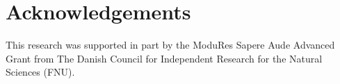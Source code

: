 \documentclass[compsoc,conference,letterpaper,fleqn]{IEEEtran}
\begin{document}
\begin{comment}
** LB: maybe we can present the examples informally before the logical relation and then return to them after the logical relation (to present the formal properties) ?

** Logical relation
   
   - Intuition
   - Worlds
   - Logical relation
   - Fundamental theorem
   - Discussion/comparison with related Dreyer-Neis-Birkedal and with Hur-Dreyer

** Examples
   - Ticket dispenser
   - The awkward example and variants
   - A sandboxing example?

     For example, an untrusted advertisement scenario with initialization code
     that registers a redraw callback. The redraw callback gets temporary
     read-write access to a framebuffer.
  
   - Some compartmentalisation result?
     
** Discussion, future work
   - A general well-bracketed control flow result?
     + what would that result say?
     + possible idea: fully abstract compilation from an assembly language with
       a trusted stack to one without
     + the LR and some of the lemmas already imply well-bracketed control flow, as seen in examples
   - Relation to local parameters in Scala, Algol/Pascal second-class function parameters?
   - Stack clearing realistic?
   - Non-modularity of heap allocation requirement for adversary callbacks

** Related work

   - Dreyer-Neis-Birkedal
   - CHERI papers
   - Akram's thesis
   - http://2016.splashcon.org/event/splash-2016-oopsla-gentrification-gone-too-far-affordable-2nd-class-values-for-fun-and-co-effect
   - other papers that enforce well-bracketed control flow at low level
     (using a trusted stack manager)
     + http://ieeexplore.ieee.org/abstract/document/7536364/
     + http://ieeexplore.ieee.org/abstract/document/7536366/
     + other stuff?

** Conclusion

  
\end{comment}



\section*{Acknowledgements}
\label{sec:acknowledgements}

This research was supported in part by the ModuRes Sapere Aude Advanced Grant from The Danish Council for Independent Research for the Natural Sciences (FNU).
\end{document}
